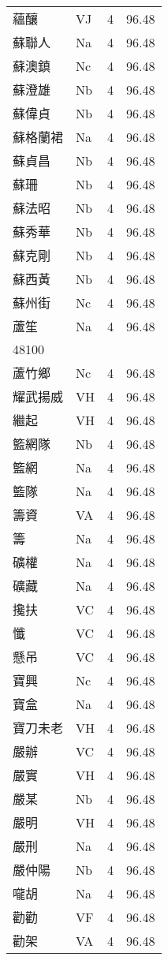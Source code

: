 \documentclass[twocolumn]{book}
\begin{document}
\begin{supertabular}{llrr}
蘊釀 & VJ & 4 &  96.48\\
蘇聯人 & Na & 4 &  96.48\\
蘇澳鎮 & Nc & 4 &  96.48\\
蘇澄雄 & Nb & 4 &  96.48\\
蘇偉貞 & Nb & 4 &  96.48\\
蘇格蘭裙 & Na & 4 &  96.48\\
蘇貞昌 & Nb & 4 &  96.48\\
蘇珊 & Nb & 4 &  96.48\\
蘇法昭 & Nb & 4 &  96.48\\
蘇秀華 & Nb & 4 &  96.48\\
蘇克剛 & Nb & 4 &  96.48\\
蘇西黃 & Nb & 4 &  96.48\\
蘇州街 & Nc & 4 &  96.48\\
蘆笙 & Na & 4 &  96.48\\
48100\\
蘆竹鄉 & Nc & 4 &  96.48\\
耀武揚威 & VH & 4 &  96.48\\
繼起 & VH & 4 &  96.48\\
籃網隊 & Nb & 4 &  96.48\\
籃網 & Na & 4 &  96.48\\
籃隊 & Na & 4 &  96.48\\
籌資 & VA & 4 &  96.48\\
籌 & Na & 4 &  96.48\\
礦權 & Na & 4 &  96.48\\
礦藏 & Na & 4 &  96.48\\
攙扶 & VC & 4 &  96.48\\
懺 & VC & 4 &  96.48\\
懸吊 & VC & 4 &  96.48\\
寶興 & Nc & 4 &  96.48\\
寶盒 & Na & 4 &  96.48\\
寶刀未老 & VH & 4 &  96.48\\
嚴辦 & VC & 4 &  96.48\\
嚴實 & VH & 4 &  96.48\\
嚴某 & Nb & 4 &  96.48\\
嚴明 & VH & 4 &  96.48\\
嚴刑 & Na & 4 &  96.48\\
嚴仲陽 & Nb & 4 &  96.48\\
嚨胡 & Na & 4 &  96.48\\
勸勸 & VF & 4 &  96.48\\
勸架 & VA & 4 &  96.48\\

\end{supertabular}
\end{document}
